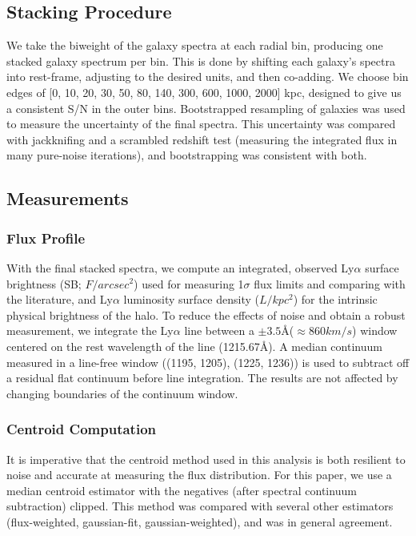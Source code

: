 \documentclass[linenumbers,amsmath,trackchanges,preprint2]{aastex702}
\begin{document}
\subsection{Stacking Procedure}
\par We take the biweight of the galaxy spectra at each radial bin, producing one stacked galaxy spectrum per bin. This is done by shifting each galaxy's spectra into rest-frame, adjusting to the desired units, and then co-adding. We choose bin edges of [0, 10, 20, 30, 50, 80, 140, 300, 600, 1000, 2000] kpc, designed to give us a consistent S/N in the outer bins. Bootstrapped resampling of galaxies was used to measure the uncertainty of the final spectra. This uncertainty was compared with jackknifing and a scrambled redshift test (measuring the integrated flux in many pure-noise iterations), and bootstrapping was consistent with both.

\subsection{Measurements}
\subsubsection{Flux Profile}
\par With the final stacked spectra, we compute an integrated, observed Ly$\alpha$ surface brightness (SB; $F/arcsec^2$) used for measuring 1$\sigma$ flux limits and comparing with the literature, and Ly$\alpha$ luminosity surface density ($L/kpc^2$) for the intrinsic physical brightness of the halo. To reduce the effects of noise and obtain a robust measurement, we integrate the Ly$\alpha$ line between a $\pm3.5$\AA \xspace ($\approx860km/s$) window centered on the rest wavelength of the line (1215.67\AA). A median continuum measured in a line-free window ((1195, 1205), (1225, 1236)) is used to subtract off a residual flat continuum before line integration. The results are not affected by changing boundaries of the continuum window.

\subsubsection{Centroid Computation}
\par It is imperative that the centroid method used in this analysis is both resilient to noise and accurate at measuring the flux distribution. For this paper, we use a median centroid estimator with the negatives (after spectral continuum subtraction) clipped. This method was compared with several other estimators (flux-weighted, gaussian-fit, gaussian-weighted), and was in general agreement.
\end{document}
